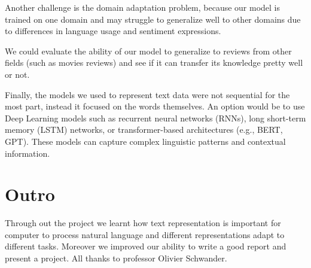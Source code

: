 \documentclass{article}
\begin{document}
Another challenge is the domain adaptation problem, because our model is trained on one domain and may struggle to generalize well to other domains due to differences in language usage and sentiment expressions.

We could evaluate the ability of our model to generalize to reviews from other fields (such as movies reviews) and see if it can transfer its knowledge pretty well or not.

Finally, the models we used to represent text data were not sequential for the most part, instead it focused on the words themselves. An option would be to use Deep Learning models such as recurrent neural networks (RNNs), long short-term memory (LSTM) networks, or transformer-based architectures (e.g., BERT, GPT). These models can capture complex linguistic patterns and contextual information. 



\section{Outro}

Through out the project we learnt how text representation is important for computer to process natural language and different
representations adapt to different tasks. Moreover we improved our ability to write a good report
and present a project. All thanks to professor Olivier Schwander.

\printbibliography
\end{document}
